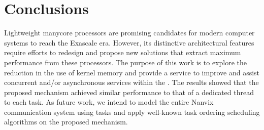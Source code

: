 \section{Conclusions}
\label{sec:conclusions}

	Lightweight manycore processors are promising candidates for modern
	computer systems to reach the Exascale era. However, its distinctive
	architectural features require efforts to redesign and propose new solutions
	that extract maximum performance from these processors. The purpose of this
	work is to explore the reduction in the use of kernel memory and provide
	a service to improve and assist concurrent and/or asynchronous services within
	the \os. The results showed that the proposed mechanism achieved similar
	performance to that of a dedicated thread to each task. As future work, we
	intend to model the entire Nanvix communication system using tasks and apply
	well-known task ordering scheduling algorithms on the proposed mechanism.

